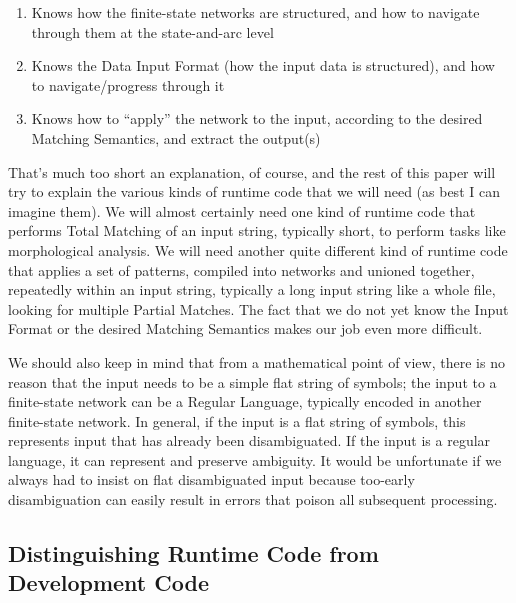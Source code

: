 \documentclass[letterpaper,12pt]{article}
\begin{document}
\begin{enumerate}
\item
Knows how the finite-state networks are structured, and how to navigate through them at the state-and-arc level
\item
Knows the Data Input Format (how the input data is structured), and how to navigate/progress through it
\item
Knows how to ``apply'' the network to the input, according to the desired Matching Semantics, and extract the
output(s)
\end{enumerate}

\noindent
That's much too short an explanation, of course, and the rest of this paper will try to explain the various kinds
of runtime code that we will need (as best I can imagine them).  We will almost certainly need one kind of runtime
code that performs Total Matching of an input string, typically short, to perform tasks like morphological analysis.  We will need
another quite different kind of runtime code that applies a set of patterns, compiled into networks and unioned together,
repeatedly within an input string, typically a long input string like a whole file, looking for multiple Partial Matches.  The fact that we do not yet know
the Input Format or the desired Matching Semantics makes our job even more difficult.

We should also keep in mind that from a mathematical point of view, there is no reason that the input needs to be a
simple flat string of symbols; the input to a finite-state network can be a Regular Language, typically encoded in
another finite-state network.  In general, if the input is a flat string of symbols, this represents input that has
already been disambiguated.  If the input is a regular language, it can represent and preserve ambiguity.  It would be unfortunate if
we always had to insist on flat disambiguated input because too-early disambiguation can easily result in errors that
poison all subsequent processing.

\subsection{Distinguishing Runtime Code from Development Code}
\end{document}
